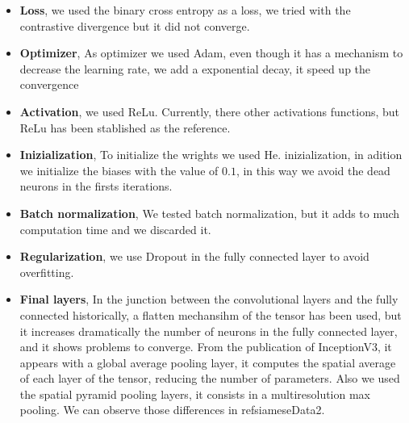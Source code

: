 \documentclass[12pt, a4paper, titlepage,twoside,openright]{article}
\begin{document}
\begin{itemize}

\item \textbf{Loss}, we used the binary cross entropy as a loss, we tried with the contrastive divergence but it did not converge.

\item \textbf{Optimizer}, As optimizer we used Adam, even though it has a mechanism to decrease the learning rate, we add a exponential decay, it speed up the convergence

\item \textbf{Activation}, we used ReLu. Currently, there other activations functions, but ReLu has been stablished as the reference.

\item \textbf{Inizialization}, To initialize the wrights we used He. inizialization, in adition we initialize the biases with the value of $0.1$, in this way we avoid the dead neurons in the firsts iterations.

\item \textbf{Batch normalization}, We tested batch normalization, but it adds to much computation time and we discarded it.

\item \textbf{Regularization}, we use Dropout in the fully connected layer to avoid overfitting.


\item \textbf{Final layers}, In the junction between the convolutional layers and the fully connected historically, a flatten mechansihm of the tensor has been used, but it increases dramatically the number of neurons in the fully connected layer, and it shows problems to converge. From the publication of InceptionV3, it appears with a global average pooling layer, it computes the spatial average of each layer of the tensor, reducing the number of parameters. Also we used the spatial pyramid pooling layers, it consists in a multiresolution max pooling. We can observe those differences in ref{siameseData2}.

\begin{figure}[H]
		
\centering


\end{figure}
\end{itemize}
\end{document}
